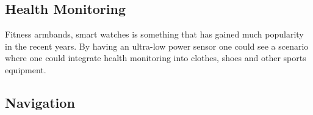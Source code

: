 \subsection{Health Monitoring}

Fitness armbands, smart watches is something that has gained much popularity in the recent years. By having an ultra-low power sensor one could see a scenario where one could integrate health monitoring into clothes, shoes and other sports equipment.

\subsection{Navigation}